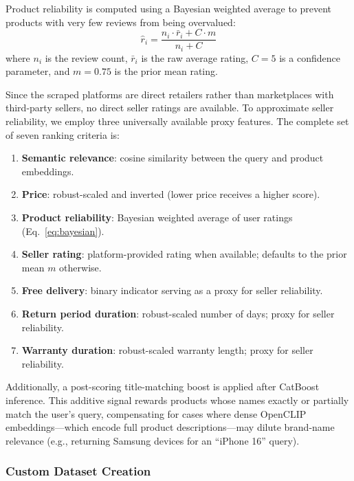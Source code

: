 \documentclass[conference]{IEEEtran}
\begin{document}
Product reliability is computed using a Bayesian weighted average to prevent products with very few reviews from being overvalued:
\begin{equation}
\hat{r}_i = \frac{n_i \cdot \bar{r}_i + C \cdot m}{n_i + C}
\label{eq:bayesian}
\end{equation}
where $n_i$ is the review count, $\bar{r}_i$ is the raw average rating, $C = 5$ is a confidence parameter, and $m = 0.75$ is the prior mean rating.

Since the scraped platforms are direct retailers rather than marketplaces with third-party sellers, no direct seller ratings are available. To approximate seller reliability, we employ three universally available proxy features. The complete set of seven ranking criteria is:

\begin{enumerate}
    \item \textbf{Semantic relevance}: cosine similarity between the query and product embeddings.
    \item \textbf{Price}: robust-scaled and inverted (lower price receives a higher score).
    \item \textbf{Product reliability}: Bayesian weighted average of user ratings (Eq.~\ref{eq:bayesian}).
    \item \textbf{Seller rating}: platform-provided rating when available; defaults to the prior mean $m$ otherwise.
    \item \textbf{Free delivery}: binary indicator serving as a proxy for seller reliability.
    \item \textbf{Return period duration}: robust-scaled number of days; proxy for seller reliability.
    \item \textbf{Warranty duration}: robust-scaled warranty length; proxy for seller reliability.
\end{enumerate}

Additionally, a post-scoring title-matching boost is applied after CatBoost inference. This additive signal rewards products whose names exactly or partially match the user's query, compensating for cases where dense OpenCLIP embeddings---which encode full product descriptions---may dilute brand-name relevance (e.g., returning Samsung devices for an ``iPhone 16'' query).

\subsubsection{Custom Dataset Creation}
\end{document}
